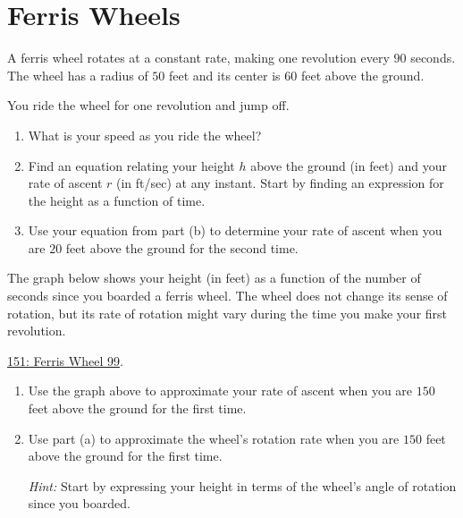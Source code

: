 \documentclass{ximera}
\begin{document}
\section{Ferris Wheels}
\begin{question}  \label{QOERERERERQ}
A ferris wheel rotates at a constant rate, making one revolution every $90$ seconds. The wheel has a radius of $50$ feet and its center is $60$ feet above the ground.

You ride the wheel for one revolution and jump off.

\begin{enumerate}
\item What is your speed as you ride the wheel?

\item Find an equation relating your height $h$ above the ground (in feet) and your rate of ascent $r$ (in ft/sec) at any instant. Start by finding an expression for the height as a function of time. 

\item Use your equation from part (b) to determine your rate of ascent when you are $20$ feet above the ground for the second time.
\end{enumerate}
\end{question}


\begin{question} \label{QsdfPERdfere}
The graph below shows your height (in feet) as a function of the number of seconds since you boarded a ferris wheel. The wheel does not change its sense of rotation, but its rate of rotation might vary during the time you make your first revolution.

\href{https://www.desmos.com/calculator/eeiburo7bd}{151: Ferris Wheel 99}.

 
\begin{onlineOnly}
    \begin{center}
\end{center}
\end{onlineOnly}

\begin{enumerate}
\item Use the graph above to approximate your rate of ascent when you are $150$ feet above the ground for the first time.

\item Use part (a) to approximate the wheel's rotation rate when you are $150$ feet above the ground for the first time. 

\emph{Hint:} Start by expressing your height in terms of the wheel's angle of rotation since you boarded. 
\end{enumerate}



\end{question}
\end{document}
